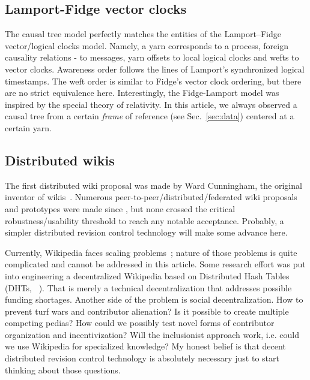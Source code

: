 \documentclass{sig-alternate}
\begin{document}
\subsection{Lamport-Fidge vector clocks} \label{sec:lamport}

The causal tree model perfectly matches the entities of the Lamport--Fidge~\cite{lamport,fidge} vector/logical clocks model.
Namely, a yarn corresponds to a process, foreign causality relations - to messages, yarn offsets to local logical clocks and wefts to vector clocks. 
Awareness order follows the lines of Lamport's synchronized logical timestamps.
The weft order is similar to Fidge's vector clock ordering, but there are no strict equivalence here.
Interestingly, the Fidge-Lamport model was inspired by the special theory of relativity.
In this article, we always observed a causal tree from a certain \emph{frame} of reference (see Sec.~\ref{sec:data}) centered at a certain yarn.

\subsection{Distributed wikis}

The first distributed wiki proposal was made by Ward Cunningham, the original inventor of wikis~\cite{folk-memory}.
Numerous peer-to-peer/distributed/federated wiki proposals and prototypes were made since \cite{www06,buraga,distriwiki,concerto}, but none crossed the critical robustness/usability threshold to reach any notable acceptance. Probably, a simpler distributed revision control technology will make some advance here.

Currently, Wikipedia faces scaling problems~\cite{wp-decay,no-singularity}; nature of those problems is quite complicated and cannot be addressed in this article.
Some research effort was put into engineering a decentralized Wikipedia based on Distributed Hash Tables (DHTs, ~\cite{urdaneta}).
That is merely a technical decentralization that addresses possible funding shortages.
Another side of the problem is social decentralization.
How to prevent turf wars and contributor alienation?
Is it possible to create multiple competing pedias?
How could we possibly test novel forms of contributor organization and incentivization?
Will the inclusionist approach work, i.e. could we use Wikipedia for specialized knowledge?
My honest belief is that decent distributed revision control technology is absolutely necessary just to start thinking about those questions.
\end{document}
